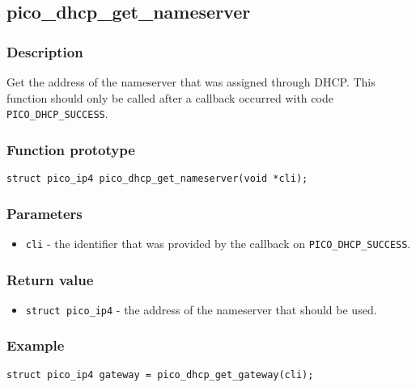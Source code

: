 \subsection{pico\_dhcp\_get\_nameserver}

\subsubsection*{Description}
Get the address of the nameserver that was assigned through DHCP. This function should
only be called after a callback occurred with code \texttt{PICO\_DHCP\_SUCCESS}. 

\subsubsection*{Function prototype}
\texttt{struct pico\_ip4 pico\_dhcp\_get\_nameserver(void *cli);}

\subsubsection*{Parameters}
\begin{itemize}[noitemsep]
\item \texttt{cli} - the identifier that was provided by the callback on \texttt{PICO\_DHCP\_SUCCESS}.
\end{itemize}

\subsubsection*{Return value}
\begin{itemize}[noitemsep]
\item \texttt{struct pico\_ip4} - the address of the nameserver that should be used. 
\end{itemize}



\subsubsection*{Example}
\begin{verbatim}
struct pico_ip4 gateway = pico_dhcp_get_gateway(cli);
\end{verbatim}
